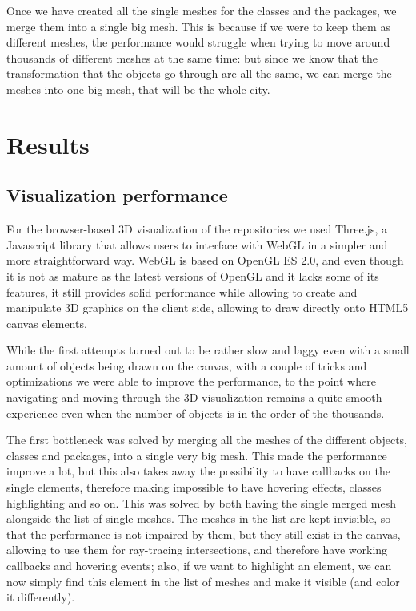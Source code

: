 \documentclass[]{usiinfbachelorproject}
\begin{document}
Once we have created all the single meshes for the classes and the packages, we merge them into a single big mesh.
This is because if we were to keep them as different meshes, the performance would struggle when trying to move around thousands of different meshes at the same time: but since we know that the transformation that the objects go through are all the same, we can merge the meshes into one big mesh, that will be the whole city.

\section{Results} \label{Results}

\subsection{Visualization performance} \label{Visualization performance}

For the browser-based 3D visualization of the repositories we used Three.js, a Javascript library that allows users to interface with WebGL in a simpler and more straightforward way. WebGL is based on OpenGL ES 2.0, and even though it is not as mature as the latest versions of OpenGL and it lacks some of its features, it still provides solid performance while allowing to create and manipulate 3D graphics on the client side, allowing to draw directly onto HTML5 canvas elements.

While the first attempts turned out to be rather slow and laggy even with a small amount of objects being drawn on the canvas, with a couple of tricks and optimizations we were able to improve the performance, to the point where navigating and moving through the 3D visualization remains a quite smooth experience even when the number of objects is in the order of the thousands.

The first bottleneck was solved by merging all the meshes of the different objects, classes and packages, into a single very big mesh. This made the performance improve a lot, but this also takes away the possibility to have callbacks on the single elements, therefore making impossible to have hovering effects, classes highlighting and so on. This was solved by both having the single merged mesh alongside the list of single meshes. The meshes in the list are kept invisible, so that the performance is not impaired by them, but they still exist in the canvas, allowing to use them for ray-tracing intersections, and therefore have working callbacks and hovering events; also, if we want to highlight an element, we can now simply find this element in the list of meshes and make it visible (and color it differently).
\end{document}
